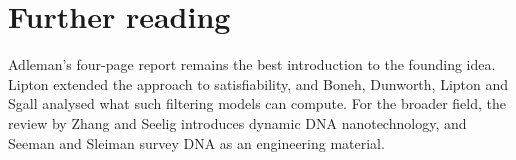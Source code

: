\section*{Further reading}
Adleman's four-page report remains the best introduction to the founding
idea.\cite{Adleman1994} Lipton extended the approach to satisfiability,\cite{Lipton1995}
and Boneh, Dunworth, Lipton and Sgall analysed what such filtering models can
compute.\cite{Boneh1996} For the broader field, the review by Zhang and Seelig
introduces dynamic DNA nanotechnology,\cite{ZhangSeelig2011} and Seeman and
Sleiman survey DNA as an engineering material.\cite{SeemanSleiman2018}

